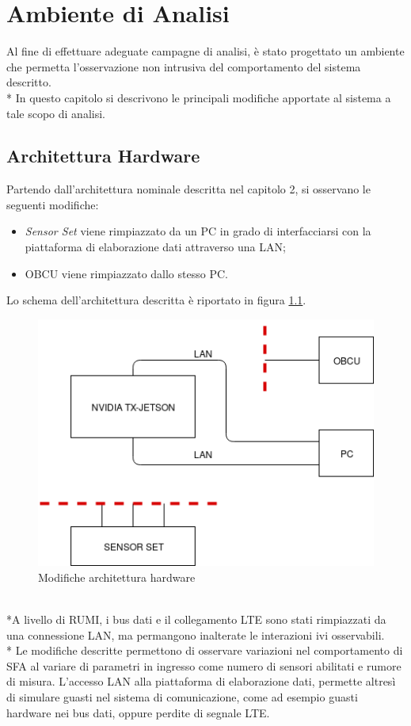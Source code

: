 \chapter{Ambiente di Analisi}
Al fine di effettuare adeguate campagne di analisi, \`e stato progettato un ambiente che permetta l'osservazione non intrusiva del comportamento del sistema descritto.\\*
In questo capitolo si descrivono le principali modifiche apportate al sistema a tale scopo di analisi.
\section{Architettura Hardware}
Partendo dall'architettura nominale descritta nel capitolo 2, si osservano le seguenti modifiche:
\begin{itemize}
	\item \emph{Sensor Set} viene rimpiazzato da un PC in grado di interfacciarsi con la piattaforma di elaborazione dati attraverso una LAN;
	\item OBCU viene rimpiazzato dallo stesso PC.
\end{itemize}
Lo schema dell'architettura descritta \`e riportato in figura \ref{fig:hwtest}.
\begin{figure}
	\centering
	\includegraphics[width=0.7\linewidth]{img/hwtest}
	\caption{Modifiche architettura hardware}
	\label{fig:hwtest}
\end{figure}
\\*A livello di RUMI, i bus dati e il collegamento LTE sono stati rimpiazzati da una connessione LAN, ma permangono inalterate le interazioni ivi osservabili.\\*
Le modifiche descritte permettono di osservare variazioni nel comportamento di SFA al variare di parametri in ingresso come numero di sensori abilitati e rumore di misura. L'accesso LAN alla piattaforma di elaborazione dati, permette altres\`i di simulare guasti nel sistema di comunicazione, come ad esempio guasti hardware nei bus dati, oppure perdite di segnale LTE. 
